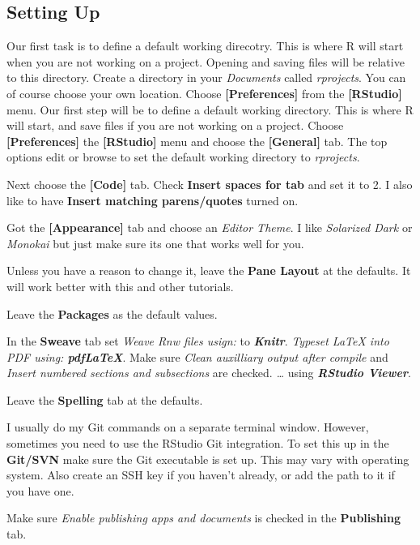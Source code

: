 \documentclass[draft]{article}\usepackage[]{graphicx}\usepackage[]{color}
\begin{document}
\subsection*{Setting Up}
 Our first task is to define a default working direcotry. This is where R will start when you are not working on a project. Opening and saving files will be relative to this directory. Create a directory in your \textit{Documents} called \textit{rprojects}. You can of course choose your own location. Choose \textbf{[Preferences]} from the \textbf{[RStudio]} menu. Our first step will be to define a default working directory. This is where R will start, and save files if you are not working on a project. Choose \textbf{[Preferences]} the \textbf{[RStudio]} menu and choose the \textbf{[General]} tab. The top options edit or browse to set the default working directory to \textit{rprojects}.
 
 
 Next choose the \textbf{[Code]} tab. Check \textbf{Insert spaces for tab} and set it to 2. I also like to have \textbf{Insert matching parens/quotes} turned on. 
 
 Got the \textbf{[Appearance]} tab and choose an \textit{Editor Theme}. I like \textit{Solarized Dark} or \textit{Monokai} but just make sure its one that works well for you. 
 
 Unless you have a reason to change it, leave the \textbf{Pane Layout} at the defaults. It will work better with this and other tutorials.
 
 Leave the \textbf{Packages} as the default values.
 
 In the \textbf{Sweave} tab set \textit{Weave Rnw files usign: } to \textbf{\textit{Knitr}}. \textit{Typeset LaTeX into PDF using: \textbf{pdfLaTeX}}. Make sure \textit{Clean auxilliary output after compile} and \textit{Insert numbered sections and subsections} are checked. \textit{\ldots} using \textbf{\textit{RStudio Viewer}}. 
 
 Leave the \textbf{Spelling} tab at the defaults.
 
 I usually do my Git commands on a separate terminal window. However, sometimes you need to use the RStudio Git integration. To set this up in the \textbf{Git/SVN} make sure the Git executable is set up. This may vary with operating system. Also create an SSH key if you haven't already, or add the path to it if you have one.
 
 Make sure \textit{Enable publishing apps and documents} is checked in the \textbf{Publishing} tab.

 
\end{document}
